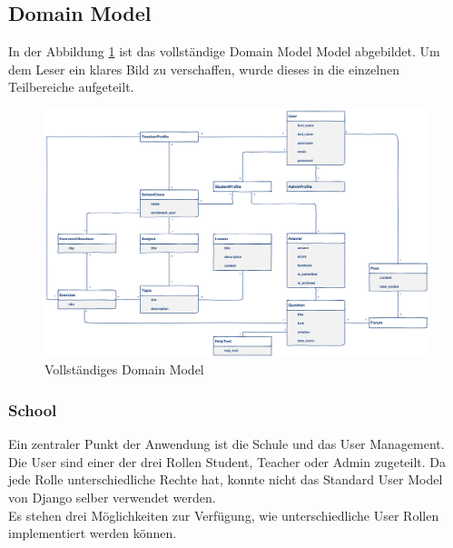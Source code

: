 \subsection{Domain Model}
In der Abbildung \ref{fig:domain_model_full} ist das vollständige Domain Model Model abgebildet. Um dem Leser ein klares Bild zu verschaffen, wurde dieses in die einzelnen Teilbereiche aufgeteilt.

\begin{landscape}

\begin{minipage}{\textwidth}
	\begin{figure}[H]
	\begin{center}
		\includegraphics[width=1.4\textwidth, keepaspectratio]{images/domain_model_full.png}
  		\caption{Vollständiges Domain Model}
		\label{fig:domain_model_full}
	\end{center}
	\end{figure}
\end{minipage}

\end{landscape}

\subsubsection*{School}
Ein zentraler Punkt der Anwendung ist die Schule und das User Management. Die User sind einer der drei Rollen Student, Teacher oder Admin zugeteilt. Da jede Rolle unterschiedliche Rechte hat, konnte nicht das Standard User Model von Django selber verwendet werden. \\
Es stehen drei Möglichkeiten zur Verfügung, wie unterschiedliche User Rollen implementiert werden können.

